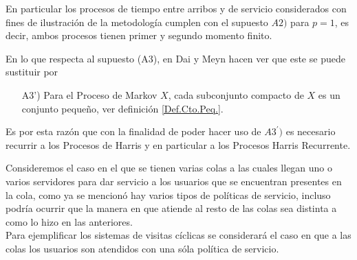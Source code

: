 \documentclass{article}
\numberwithin{equation}{section}
\begin{document}
En particular los procesos de tiempo entre arribos y de servicio considerados con fines de ilustraci\'on de la metodolog\'ia cumplen con el supuesto $A2)$ para $p=1$, es decir, ambos procesos tienen primer y segundo momento finito.

En lo que respecta al supuesto (A3), en Dai y Meyn \cite{DaiSean} hacen ver que este se puede sustituir por
\begin{itemize}
\item[A3')] Para el Proceso de Markov $X$, cada subconjunto compacto de $X$ es un conjunto peque\~no, ver definici\'on
\ref{Def.Cto.Peq.}.
\end{itemize}

Es por esta raz\'on que con la finalidad de poder hacer uso de $A3^{'})$ es necesario recurrir a los Procesos de Harris y en particular a los Procesos Harris Recurrente.


Consideremos el caso en el que se tienen varias colas a las cuales llegan uno o varios servidores para dar servicio a los usuarios que se encuentran presentes en la cola, como ya se mencion\'o hay varios tipos de pol\'iticas de servicio, incluso podr\'ia ocurrir que la manera en que atiende al resto de las colas sea distinta a como lo hizo en las anteriores.\\

Para ejemplificar los sistemas de visitas c\'iclicas se considerar\'a el caso en que a las colas los usuarios son atendidos con una s\'ola pol\'itica de servicio.\\
\end{document}
